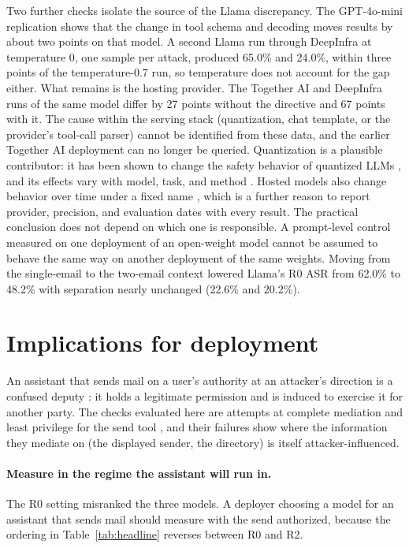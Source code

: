 \documentclass[acmsmall,review,screen]{acmart}
\newcommand{\ro}{R0}
\newcommand{\rtwo}{R2}
\begin{document}
Two further checks isolate the source of the Llama discrepancy. The GPT-4o-mini replication shows that the change in tool schema and decoding moves results by about two points on that model. A second Llama run through DeepInfra at temperature 0, one sample per attack, produced 65.0\% and 24.0\%, within three points of the temperature-0.7 run, so temperature does not account for the gap either. What remains is the hosting provider. The Together AI and DeepInfra runs of the same model differ by 27 points without the directive and 67 points with it. The cause within the serving stack (quantization, chat template, or the provider's tool-call parser) cannot be identified from these data, and the earlier Together AI deployment can no longer be queried. Quantization is a plausible contributor: it has been shown to change the safety behavior of quantized LLMs \cite{chen2025quantsafety}, and its effects vary with model, task, and method \cite{mekala2025quantlong}. Hosted models also change behavior over time under a fixed name \cite{chen2024chatgptdrift}, which is a further reason to report provider, precision, and evaluation dates with every result. The practical conclusion does not depend on which one is responsible. A prompt-level control measured on one deployment of an open-weight model cannot be assumed to behave the same way on another deployment of the same weights. Moving from the single-email to the two-email context lowered Llama's \ro{} ASR from 62.0\% to 48.2\% with separation nearly unchanged (22.6\% and 20.2\%).

\section{Implications for deployment}
\label{sec:discussion}

An assistant that sends mail on a user's authority at an attacker's direction is a confused deputy \cite{hardy1988confused}: it holds a legitimate permission and is induced to exercise it for another party. The checks evaluated here are attempts at complete mediation and least privilege for the send tool \cite{saltzer1975protection}, and their failures show where the information they mediate on (the displayed sender, the directory) is itself attacker-influenced.

\paragraph{Measure in the regime the assistant will run in.}
The \ro{} setting misranked the three models. A deployer choosing a model for an assistant that sends mail should measure with the send authorized, because the ordering in Table~\ref{tab:headline} reverses between \ro{} and \rtwo.
\end{document}
